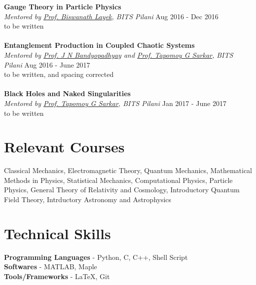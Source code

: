 \documentclass[margin, centered]{res}
\begin{document}
\begin{resume}
\textbf{Gauge Theory in Particle Physics}\\
\emph{Mentored by \href{http://universe.bits-pilani.ac.in/pilani/layek/profile}{Prof. Biswanath Layek}, BITS Pilani} \hfill Aug 2016 - Dec 2016\\
to be written \\
\\
\textbf{Entanglement Production in Coupled Chaotic Systems}\\
\emph{Mentored by \href{http://www.bits-pilani.ac.in/Pilani/jayendra/Profile}{Prof. J N Bandyopadhyay} and \href{http://www.bits-pilani.ac.in/Pilani/tapomoy/Profile}{Prof. Tapomoy G Sarkar}, BITS Pilani} \hfill Aug 2016 - June 2017\\
to be written, and spacing corrected\\
\\
\textbf{Black Holes and Naked Singularities}\\
\emph{Mentored by \href{http://www.bits-pilani.ac.in/Pilani/tapomoy/Profile}{Prof. Tapomoy G Sarkar}, BITS Pilani} \hfill Jan 2017 - June 2017\\
to be written

\section{Relevant \hspace{2mm} Courses}
Classical Mechanics, Electromagnetic Theory, Quantum Mechanics, Mathematical Methods in Physics, Statistical Mechanics, Computational Physics, Particle Physics, General Theory of Relativity and Cosmology, Introductory Quantum Field Theory, Intrductory Astronomy and Astrophysics

\section{Technical \hspace{2mm} Skills}
\textbf{Programming Languages} - Python, C, C++, Shell Script\\
\textbf{Softwares} - MATLAB, Maple \\
\textbf{Tools/Frameworks} - \LaTeX, Git


\end{resume}
\end{document}
